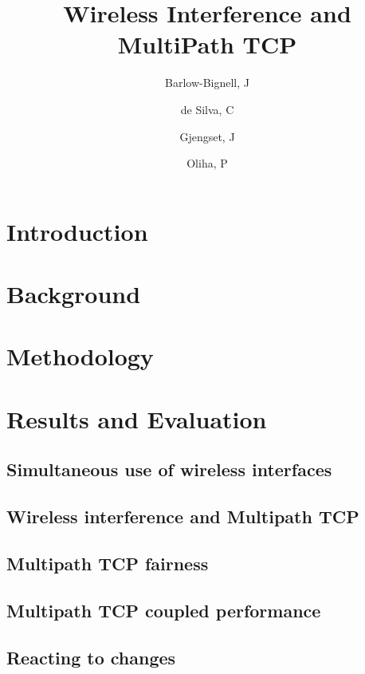 \documentclass[12pt,a4paper]{article}
\title{Wireless Interference and MultiPath TCP}
\author{Barlow-Bignell, J}
\author{de Silva, C}
\author{Gjengset, J}
\author{Oliha, P}
\affil{University College London}
\date{}
\begin{document}
\maketitle

\begin{abstract}
 
\end{abstract}
\clearpage

\section{Introduction}


\section{Background}


\section{Methodology}


\section{Results and Evaluation}

\subsection{Simultaneous use of wireless interfaces}
\label{sec:results-interference}

\subsection{Wireless interference and Multipath TCP}
\label{sec:results-mptcp}

\subsection{Multipath TCP fairness}
\label{sec:results-fairness}

\subsection{Multipath TCP coupled performance}
\label{sec:results-performance}

\subsection{Reacting to changes}
\label{sec:results-reacting}

\end{document}
